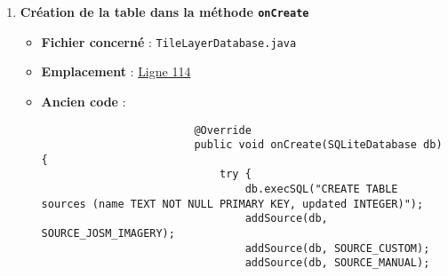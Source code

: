 \begin{enumerate}
    \item \textbf{Création de la table dans la méthode \texttt{onCreate}}
          \begin{itemize}
              \item \textbf{Fichier concerné} : \texttt{TileLayerDatabase.java}
              \item \textbf{Emplacement} :
                    \href{https://github.com/MarcusWolschon/osmeditor4android/blob/master/src/main/java/de/blau/android/resources/TileLayerDatabase.java#L114 }{Ligne 114}
              \item \textbf{Ancien code} :
                    \begin{verbatim}
                        @Override
                        public void onCreate(SQLiteDatabase db) {
                            try {
                                db.execSQL("CREATE TABLE sources (name TEXT NOT NULL PRIMARY KEY, updated INTEGER)");
                                addSource(db, SOURCE_JOSM_IMAGERY);
                                addSource(db, SOURCE_CUSTOM);
                                addSource(db, SOURCE_MANUAL);


\end{verbatim}
\end{itemize}
\end{enumerate}
